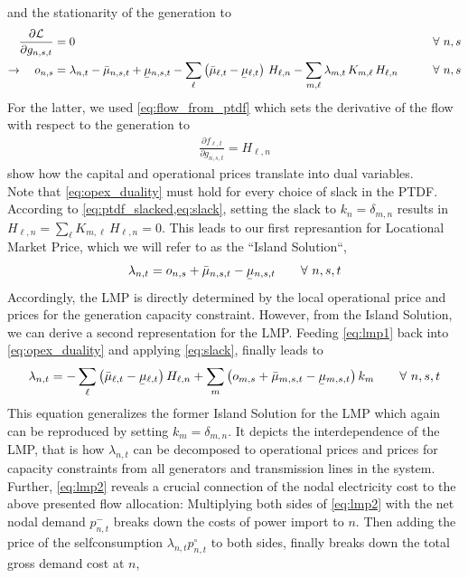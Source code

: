 \documentclass[11pt]{article}
\newcommand{\ubar}[1]{\underaccent{\bar}{#1}}
\newcommand{\generation}[1][n]{g_{#1,s,t}}
\newcommand{\opexGeneration}[1][n]{o_{#1,s}}
\newcommand{\incidence}[1][n]{K_{#1,\ell}}
\newcommand{\ptdf}[1][n]{H_{\ell,#1}}
\newcommand{\slack}[1][n]{k_{#1}}
\newcommand{\mulowergeneration}[1][n]{\ubar{\mu}_{#1,s,t}}
\newcommand{\muuppergeneration}[1][n]{\bar{\mu}_{#1,s,t}}
\newcommand{\mulowerflow}{\ubar{\mu}_{\ell,t}}
\newcommand{\muupperflow}{\bar{\mu}_{\ell,t}}
\newcommand{\lmp}[1][n]{\lambda_{#1,t}}
\newcommand{\flow}{f_{\ell,t}}
\newcommand{\netconsumption}[1][n]{p^{-}_{#1,t}}
\newcommand{\selfconsumption}[1][n]{p^{\circ}_{#1,t}}
\newcommand{\lagrangian}{\mathcal{L}}
\newcommand{\Forall}[1]{\hspace{20pt} \forall \,\, #1 }
\newcommand{\pdv}[2]{\frac{\partial #1}{\partial #2}}
\begin{document}
and the stationarity of the generation to 
\begin{align}
 \pdv{\lagrangian}{\generation} &= 0  &\Forall{n,s} \\
 \rightarrow \hspace{10pt}  \opexGeneration &=  \lmp - \muuppergeneration + \mulowergeneration - \sum_{\ell} \left( \muupperflow - \mulowerflow\right)  \, \ptdf - \sum_{m,\ell}\lmp[m] \, \incidence[m] \, \ptdf   &\Forall{n,s} \label{eq:opex_duality}
\end{align}
% 
For the latter, we used \cref{eq:flow_from_ptdf} which sets the derivative of the flow with respect to the generation to 
\begin{align}
\pdv{\flow}{\generation} = \ptdf                                                                                                                                                   \end{align}
 show how the capital and operational prices translate into dual variables. \\

Note that \cref{eq:opex_duality} must hold for every choice of slack in the PTDF. According to \cref{eq:ptdf_slacked,eq:slack}, setting the slack to $\slack = \delta_{m,n}$ results in $\ptdf = \sum_\ell \incidence[m] \, \ptdf = 0$. This leads to our first represantion for Locational Market Price, which we will refer to as the ``Island Solution``,
\begin{align}
\lmp  =  \opexGeneration + \muuppergeneration - \mulowergeneration \Forall{n,s,t}
\label{eq:lmp1}
\end{align}
Accordingly, the LMP is directly determined by the local operational price and prices for the generation capacity constraint. 
However, from the Island Solution, we can derive a second representation for the LMP. Feeding \cref{eq:lmp1} back into \cref{eq:opex_duality} and applying \cref{eq:slack}, finally leads to 
\begin{align}
\lmp =  - \sum_\ell \left( \muupperflow - \mulowerflow\right) \ptdf + \sum_m \left( \opexGeneration[m] + \muuppergeneration[m] - \mulowergeneration[m] \right) \slack[m] \Forall{n,s,t} 
\label{eq:lmp2}
\end{align}
This equation generalizes the former Island Solution for the LMP which again can be reproduced by setting $\slack[m] = \delta_{m,n}$. It depicts the interdependence of the LMP, that is how $\lmp$ can be decomposed to operational prices and prices for capacity constraints from all generators and transmission lines in the system. 
Further, \cref{eq:lmp2} reveals a crucial connection of the nodal electricity cost to the above presented flow allocation:
Multiplying both sides of \cref{eq:lmp2}  with the net nodal demand $\netconsumption$
breaks down the costs of power import to $n$. Then adding the price of the selfconsumption $\lmp \selfconsumption$ to both sides, finally breaks down the total gross demand cost at $n$,
\end{document}
